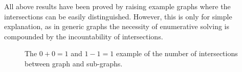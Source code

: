 \documentclass[journal]{IEEEtran}
\begin{document}
All above results have been proved by raising example graphs where the intersections can be easily distinguished. However, this is only for simple explanation, as in generic graphs the necessity of enumerative solving is compounded by the incountability of intersections. 

\begin{figure}[t]
\centering
{}
\caption{The $0 + 0 = 1$ and $1 - 1 = 1$ example of the number of intersections between graph and sub-graphs. }\label{fig:add}
\end{figure}
\end{document}
